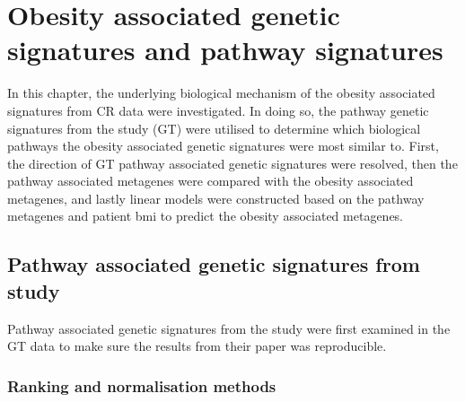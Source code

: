 \chapter{Obesity associated genetic signatures and pathway signatures}
\label{cha:obesity_associated_genetic_signature_and_pathway_signatures}

In this chapter, the underlying biological mechanism of the obesity associated signatures from CR data were investigated.
In doing so, the pathway genetic signatures from the \citet{Gatza2010a} study (GT) were utilised to determine which biological pathways the obesity associated genetic signatures were most similar to.
First, the direction of GT pathway associated genetic signatures were resolved, then the pathway associated metagenes were compared with the obesity associated metagenes, and lastly linear models were constructed based on the pathway metagenes and patient \gls{bmi} to predict the obesity associated metagenes.

\section{Pathway associated genetic signatures from \citet{Gatza2010a} study}
\label{sec:pathway_associated_genetic_signatures_from_gatza2010a_study}

Pathway associated genetic signatures from the \citet{Gatza2010a} study were first examined in the GT data to make sure the results from their paper was reproducible.

\subsection{Ranking and normalisation methods}
\label{sub:ranking_and_normalisation_methods}

